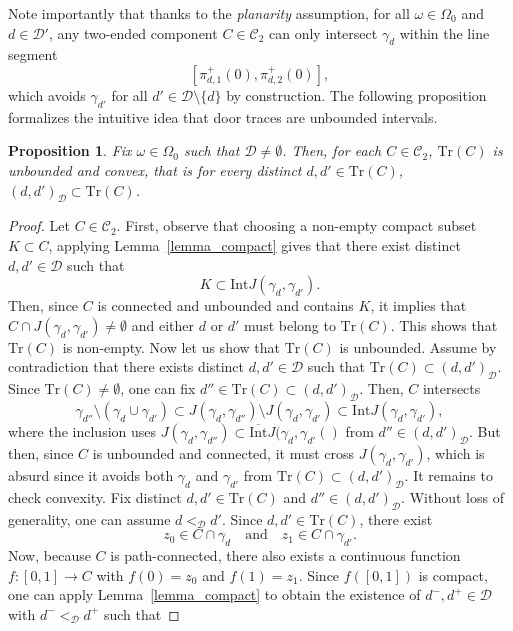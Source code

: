 \documentclass[a4paper, 11pt]{article} %
\theoremstyle{plain}
\newtheorem{proposition}[theorem]{Proposition}
\newcommand{\trace}{\mathrm{Tr}}
\newcommand{\Int}{\mathrm{Int}}
\newcommand{\clInt}{\overline{\mathrm{Int}}}
\newcommand{\D}{\mathcal D}
\newcommand{\1}{\mathds 1}
\numberwithin{equation}{section}
\begin{document}
Note importantly that thanks to the \emph{planarity} assumption, for all $\omega\in\Omega_0$ and $d\in\D'$, any two-ended component $C\in\mathcal C_2$ can only intersect $\gamma_d$ within the line segment 
    \[[\pi_{d,1}^+(0),\pi_{d,2}^+(0)],\]
which avoids $\gamma_{d'}$ for all $d'\in\D\setminus\{d\}$ by construction. The following proposition formalizes the intuitive idea that door traces are unbounded intervals.

\begin{proposition}
    \label{prop_unbounded_convex}
    Fix $\omega\in\Omega_0$ such that $\D\neq\emptyset$. Then, for each $C\in\mathcal C_2$, $\trace(C)$ is unbounded and convex, that is for every distinct $d,d'\in\trace(C)$, $(d,d')_{\D}\subset\trace(C)$.
\end{proposition}

\begin{proof}
    Let $C\in\mathcal C_2$. First, observe that choosing a non-empty compact subset $K\subset C$, applying Lemma~\ref{lemma_compact} gives that there exist distinct $d,d'\in\D$ such that
        \[K\subset \Int J(\gamma_d,\gamma_{d'}).\]
    Then, since $C$ is connected and unbounded and contains $K$, it implies that $C\cap J(\gamma_d,\gamma_{d'})\neq\emptyset$ and either $d$ or $d'$ must belong to $\trace(C)$. This shows that $\trace(C)$ is non-empty. Now let us show that $\trace(C)$ is unbounded. Assume by contradiction that there exists distinct $d,d'\in\D$ such that $\trace(C)\subset(d, d')_\D$. Since $\trace(C)\neq\emptyset$, one can fix $d''\in\trace(C)\subset(d, d')_\D$. Then, $C$ intersects
        \[\gamma_{d''}\setminus(\gamma_d\cup \gamma_{d'})\subset J(\gamma_d,\gamma_{d''})\setminus J(\gamma_d,\gamma_{d'})\subset\Int J(\gamma_d,\gamma_{d'}),\]
    where the inclusion uses $J(\gamma_d,\gamma_{d''})\subset\clInt J(\gamma_d,\gamma_{d'}()$ from $d''\in(d,d')_\D$. But then, since $C$ is unbounded and connected, it must cross $J(\gamma_d,\gamma_{d'})$, which is absurd since it avoids both $\gamma_d$ and $\gamma_{d'}$ from $\trace(C)\subset(d, d')_\D$. It remains to check convexity. Fix distinct $d, d'\in\trace(C)$ and $d''\in(d,d')_\D$. Without loss of generality, one can assume $d<_\D d'$. Since $d,d'\in\trace(C)$, there exist
        \[z_0\in C\cap\gamma_d\quad\text{and}\quad z_1\in C\cap\gamma_{d'}.\]
    Now, because $C$ is path-connected, there also exists a continuous function $f:[0,1]\to C$ with $f(0)=z_0$ and $f(1)=z_1$. Since $f([0,1])$ is compact, one can apply Lemma~\ref{lemma_compact} to obtain the existence of $d^-,d^+\in\D$ with $d^-<_\D d^+$ such that

\end{proof}
\end{document}
